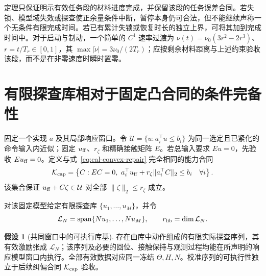 \documentclass[11pt,a4paper]{article}
\numberwithin{equation}{section}
\theoremstyle{definition}
\newtheorem{assumption}[theorem]{假设}
\begin{document}
定理只保证明示有效任务段的材料进度完成，并保留该段的任务误差合同。若失锁、模型域失效或探查使正余量条件中断，暂停本身仍可合法，但不能继续声称一个无条件有限完成时间。若已有累计失锁或恢复时长的独立上界，可将其加到完成时间中。对于启动与制动，一个简单的 $C^1$ 速率过渡为 $\nu(t)=\nu_0(3r^2-2r^3)$、$r=t/T_r\in[0,1]$，其 $\max|\dot\nu|=3\nu_0/(2T_r)$；应按剩余材料距离与上述约束验收该段，而不是在非零速度时瞬时置零。



\section{有限探查库相对于固定凸合同的条件完备性}
\label{sec:cal-finite}

固定一个实现 $a$ 及其局部响应窗口。令 $\mathcal U=\{u:a_i^\top u\le b_i\}$ 为同一选定且已紧化的命令输入内近似；固定 $u_{\rm ff}$、$r_\zeta$ 和精确接触矩阵 $E$。若总输入要求 $Eu=0$，先验收 $Eu_{\rm ff}=0$。定义与式~\eqref{eq:cal-convex-repair} 完全相同的能力合同
\begin{equation}
 \mathcal K_{\rm cap}=
 \left\{
 C:
 EC=0,\ 
 a_i^\top u_{\rm ff}
 +r_\zeta\|a_i^\top C\|_2\le b_i
 \quad\forall i
 \right\}.
 \label{rev:eq:same-convex-contract}
\end{equation}
该集合保证 $u_{\rm ff}+C\zeta\in\mathcal U$ 对全部
$\|\zeta\|_2\le r_\zeta$ 成立。

对该固定模型给定有限探查库
$\{u_1,\ldots,u_M\}$，并令
\begin{equation}
 \mathcal L_N=
 \operatorname{span}\{Nu_1,\ldots,Nu_M\},
 \qquad
 r_{\rm lib}=\dim\mathcal L_N .
 \label{rev:eq:library-space}
\end{equation}

\begin{assumption}[共同窗口中的可执行库基]
\label{rev:ass:executable-library}
存在由库中动作组成的有限实际探查序列，其有效激励张成 $\mathcal L_N$；该序列及必要的回位、接触保持与观测过程均能在所声明的响应模型窗口内执行。全部有效数据对应同一冻结 $\Theta,H,N$。校准序列的可执行性独立于后续纠偏合同 $\mathcal K_{\rm cap}$ 验收。
\end{assumption}
\end{document}
